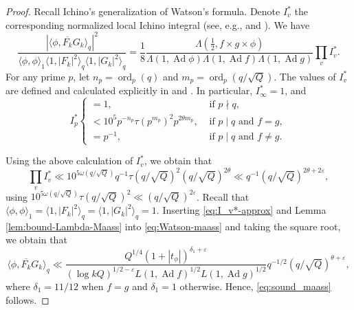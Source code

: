 \documentclass[12pt,reqno]{amsart}
\theoremstyle{remark}
\DeclareMathOperator{\ad}{Ad}
\DeclareMathOperator{\ord}{ord}
\numberwithin{equation}{section}
\begin{document}
 
    \begin{proof} 
    Recall Ichino's generalization of Watson's formula. Denote $I_v^*$ the corresponding normalized local Ichino integral (see, e.g., \cite[Theorem 3.1]{NPS} and \cite[Remark 4.2]{N}). We have 
		\begin{equation}\label{eq:Watson-maass}
			\frac{|\langle \phi, \overline{F_k}G_k \rangle_q|^2}{\langle \phi, \phi \rangle_1 \langle 1, |F_k|^2 \rangle_q \langle 1, |G_k|^2 \rangle_q} = \frac{1}{8}\frac{\Lambda(\tfrac{1}{2}, f \times g \times \phi)}{\Lambda(1, \ad \phi)\Lambda(1,\ad f)\Lambda(1,\ad g)} \prod_v I_v^*.
		\end{equation}
    For any prime $p$, let $n_p = \ord_p(q)$ and $m_p = \ord_p({q}/{\sqrt{Q}})$. The values of  $I_v^*$  are defined and calculated explicitly in \cite[Section 2]{NPS} and \cite[Section 4]{N}. In particular, $I_\infty^* = 1$, and 
		\begin{equation}\label{eq:I_p*} I_p^*
			\begin{cases}
				= 1, &\text{ if } p \nmid q,\\
				< 10^5p^{-n_p}\tau(p^{m_p})^2p^{2\theta m_p}, &\text{ if } p \mid  q \text{ and } f=g,\\
                = p^{-1}, &\text{ if } p \mid  q \text{ and } f\neq g.
			\end{cases}
		\end{equation}
        
		Using the above calculation of $I_v^*$, we obtain that 
        \begin{equation}\label{eq:I_v*-approx}
            \prod_v I_v^* \ll 10^{5\omega({q}/{\sqrt{Q}})}q^{-1}\tau({q}/{\sqrt{Q}})^2({q}/{\sqrt{Q}})^{2\theta} \ll q^{-1}({q}/{\sqrt{Q}})^{2\theta+2\varepsilon},
         \end{equation}
        using $10^{5\omega(q/\sqrt{Q})}\tau(q/\sqrt{Q})^2 \ll (q/\sqrt{Q})^{2\varepsilon}$.
        Recall that $\langle \phi, \phi \rangle_1 = \langle 1, |F_k|^2 \rangle_q = \langle 1, |G_k|^2 \rangle_q = 1$. Inserting \eqref{eq:I_v*-approx} and Lemma \ref{lem:bound-Lambda-Maass} into \eqref{eq:Watson-maass} and taking the square root, we obtain that 
\begin{equation}\label{eq:watson-cor1}
		  \langle \phi, \overline{F_k}G_k \rangle_q \ll \frac{Q^{1/4}(1+|t_{\phi}|)^{\delta_1+\varepsilon}}{(\log kQ)^{1/2-\varepsilon}L(1,\ad f)^{1/2}L(1,\ad g)^{1/2}} q^{-1/2}({q}/{\sqrt{Q}})^{\theta+\varepsilon},
		\end{equation}
    where $\delta_1 = 11/12$ when $f=g$ and $\delta_1 = 1$ otherwise. Hence, \eqref{eq:sound_maass} follows.


\end{proof}
\end{document}
